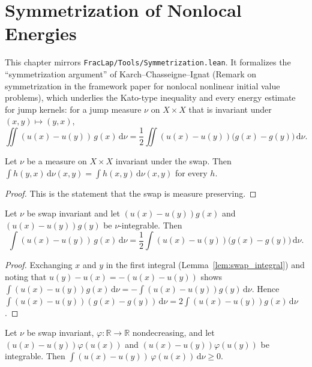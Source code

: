 \chapter{Symmetrization of Nonlocal Energies}

This chapter mirrors \texttt{FracLap/Tools/Symmetrization.lean}. It formalizes the ``symmetrization argument'' of Karch--Chasseigne--Ignat (Remark on symmetrization in the framework paper for nonlocal nonlinear initial value problems), which underlies the Kato-type inequality and every energy estimate for jump kernels: for a jump measure $\nu$ on $X \times X$ that is invariant under $(x, y) \mapsto (y, x)$,
\[
  \iint (u(x) - u(y))\, g(x)\, \mathrm{d}\nu = \frac12 \iint (u(x) - u(y))\bigl(g(x) - g(y)\bigr)\, \mathrm{d}\nu.
\]

\begin{lemma}\label{lem:swap_integral}
\leanok
Let $\nu$ be a measure on $X \times X$ invariant under the swap. Then $\int h(y, x)\, \mathrm{d}\nu(x, y) = \int h(x, y)\, \mathrm{d}\nu(x, y)$ for every $h$.
\end{lemma}

\begin{proof}
\leanok
This is the statement that the swap is measure preserving.
\end{proof}

\begin{theorem}\label{thm:symmetrization}
\leanok
Let $\nu$ be swap invariant and let $(u(x) - u(y)) g(x)$ and $(u(x) - u(y)) g(y)$ be $\nu$-integrable. Then
\[
  \int (u(x) - u(y))\, g(x)\, \mathrm{d}\nu = \frac12 \int (u(x) - u(y))\bigl(g(x) - g(y)\bigr)\, \mathrm{d}\nu.
\]
\end{theorem}

\begin{proof}
\leanok
Exchanging $x$ and $y$ in the first integral (Lemma~\ref{lem:swap_integral}) and noting that $u(y) - u(x) = -(u(x) - u(y))$ shows $\int (u(x) - u(y)) g(x)\, \mathrm{d}\nu = -\int (u(x) - u(y)) g(y)\, \mathrm{d}\nu$. Hence $\int (u(x) - u(y))(g(x) - g(y))\, \mathrm{d}\nu = 2 \int (u(x) - u(y)) g(x)\, \mathrm{d}\nu$.
\end{proof}

\begin{theorem}\label{thm:monotone_dissipation}
\leanok
Let $\nu$ be swap invariant, $\varphi : \mathbb{R} \to \mathbb{R}$ nondecreasing, and let $(u(x) - u(y)) \varphi(u(x))$ and $(u(x) - u(y)) \varphi(u(y))$ be integrable. Then $\int (u(x) - u(y))\, \varphi(u(x))\, \mathrm{d}\nu \ge 0$.
\end{theorem}

